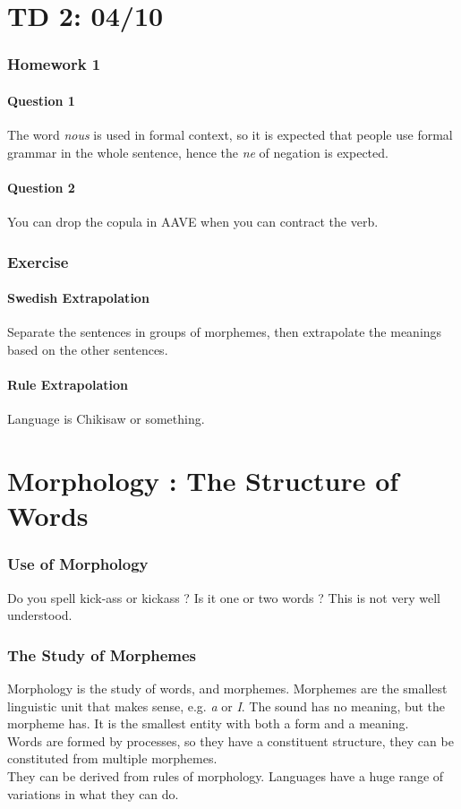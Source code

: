 \documentclass{cours}
\begin{document}
\part{TD 2: 04/10}
\section{Homework 1}
\subsection{Question 1}
The word \textsl{nous} is used in formal context, so it is expected that people use formal grammar in the whole sentence, hence the \textsl{ne} of negation is expected. 

\subsection{Question 2}
You can drop the copula in AAVE when you can contract the verb. 

\section{Exercise}
\subsection{Swedish Extrapolation}
Separate the sentences in groups of morphemes, then extrapolate the meanings based on the other sentences.

\subsection{Rule Extrapolation}
Language is Chikisaw or something.

\part[Cours 3: 05/10]{Morphology : The Structure of Words}
\section{Use of Morphology}
Do you spell kick-ass or kickass ? Is it one or two words ? This is not very well understood.

\section{The Study of Morphemes}
Morphology is the study of words, and morphemes. Morphemes are the smallest linguistic unit that makes sense, e.g. \textsl{a} or \textsl{I}. 
The sound has no meaning, but the morpheme has. It is the smallest entity with both a form and a meaning.\\
Words are formed by processes, so they have a constituent structure, they can be constituted from multiple morphemes.\\
They can be derived from rules of morphology. Languages have a huge range of variations in what they can do.\\
\end{document}
